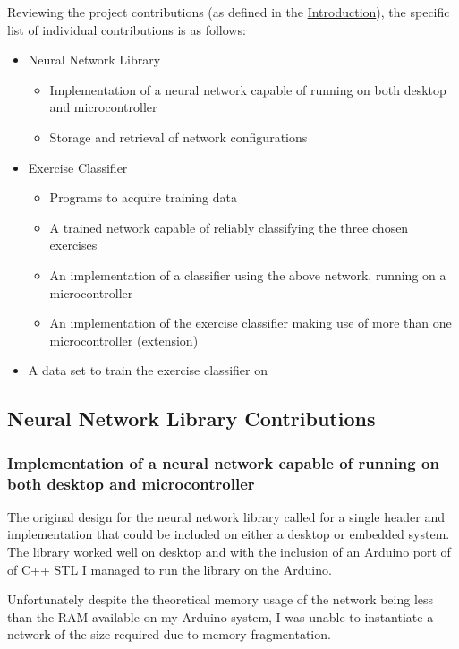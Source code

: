 \documentclass[a4paper]{article}
\begin{document}
Reviewing the project contributions (as defined in the \hyperref[subsec:in_cs]{Introduction}), the specific list of individual contributions is as follows:

\begin{itemize}
\item Neural Network Library 
  \begin{itemize}
  \item Implementation of a neural network capable of running on  both desktop and microcontroller
    \item Storage and retrieval of network configurations
  \end{itemize}
\item Exercise Classifier
  \begin{itemize}
  \item Programs to acquire training data
    \item A trained network capable of reliably classifying the three chosen exercises
    \item An implementation of a classifier using the above network, running on a microcontroller
    \item An implementation of the exercise classifier making use of more than one microcontroller (extension)
  \end{itemize}
\item A data set to train the exercise classifier on
\end{itemize}

\subsection{Neural Network Library Contributions}%
\label{subsec:ev_nn}

\subsubsection{Implementation of a neural network capable of running on  both desktop and microcontroller}

The original design for the neural network library called for a single header and implementation that could be included on either a desktop or embedded system. The library worked well on desktop and with the inclusion of an Arduino port of of C++ STL\cite{evref1} I managed to run the library on the Arduino. 

Unfortunately despite the theoretical memory usage of the network being less than the RAM available on my Arduino system, I was unable to instantiate a network of the size required due to memory fragmentation. 
\end{document}

